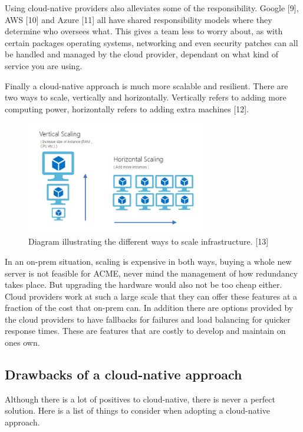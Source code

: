   Using cloud-native providers also alleviates some of the responsibility. Google [9], AWS [10] and Azure [11] all have shared responsibility models where 
  they determine who oversees what. This gives a team less to worry about, as with certain packages operating systems, networking and even 
  security patches can all be handled and managed by the cloud provider, dependant on what kind of service you are using.

  Finally a cloud-native approach is much more scalable and resilient. There are two ways to scale, vertically and horizontally.
  Vertically refers to adding more computing power, horizontally refers to adding extra machines [12].

  \begin{figure}[H]
    \centering
    \includegraphics[width=8cm]{assets/scalingOptions.jpg}
    \caption{Diagram illustrating the different ways to scale infrastructure. [13]}
    \label{fig:scalingOptions}
  \end{figure}

  In an on-prem situation, scaling is expensive in both ways, buying a whole new server is not feasible for ACME, never mind the management of how
  redundancy takes place. But upgrading the hardware would also not be too cheap either. Cloud providers work at such a large scale that they can offer
  these features at a fraction of the cost that on-prem can. In addition there are options provided by the cloud providers to have fallbacks for failures and 
  load balancing for quicker response times. These are features that are costly to develop and maintain on ones own. 

  \subsection{Drawbacks of a cloud-native approach}
  Although there is a lot of positives to cloud-native, there is never a perfect solution. Here is a list of things to consider when adopting a cloud-native
  approach.

